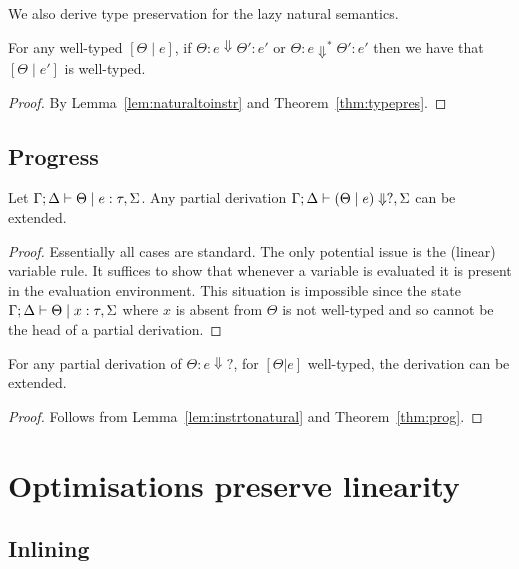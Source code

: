 \documentclass[acmsmall,review,screen]{acmart}
\begin{document}
We also derive type preservation for the lazy natural semantics.

  \begin{theorem}
For any well-typed $[\Theta \mid e]$, if $\Theta : e \Downarrow
\Theta' : e'$ or $\Theta : e \Downarrow^* \Theta' : e'$ then we have
that $[\Theta \mid e']$ is well-typed.
\end{theorem}
\begin{proof}
By Lemma~\ref{lem:naturaltoinstr} and Theorem~\ref{thm:typepres}.
\end{proof}

\subsection{Progress\label{sec:proof:progress}}

%

\begin{theorem}[Progress]\label{thm:prog}
Let $\Gamma ; \Delta \vdash \Theta \mid e : \tau,\Sigma$. Any partial derivation $\Gamma; \Delta \vdash (\Theta \mid e)
\Downarrow?,\Sigma$ can be extended. 
\end{theorem}

\begin{proof}
 Essentially all cases are standard. The only potential issue is the
 (linear) variable rule.
It suffices to show that whenever a variable is evaluated it is
present in the evaluation environment. This situation is impossible
since the state
$\Gamma ; \Delta \vdash \Theta \mid x : \tau , \Sigma$ where $x$ is absent
from $\Theta$ is not well-typed and so cannot be the head of a partial
derivation. 
\end{proof}

\begin{theorem}[Progress]
For any partial derivation of $\Theta : e \Downarrow?$, for $[\Theta |
e]$ well-typed, the derivation can be extended.
\end{theorem}
\begin{proof}
Follows from Lemma~\ref{lem:instrtonatural} and Theorem~\ref{thm:prog}.
 \end{proof}


\section{Optimisations preserve linearity}\label{app:optimisations}

\subsection{Inlining}

\end{document}
